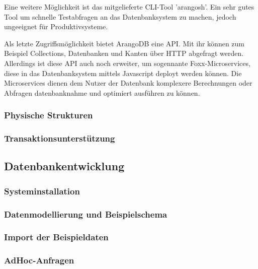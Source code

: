 Eine weitere Möglichkeit ist das mitgelieferte \ac{CLI}-Tool 'arangosh'. Ein sehr gutes Tool um schnelle Testabfragen an das Datenbanksystem zu machen, jedoch ungeeignet für Produktivsysteme. \cite{ADB_arangosh}

Als letzte Zugriffsmöglichkeit bietet ArangoDB eine \ac{API}. Mit ihr können zum Beispiel Collections, Datenbanken und Kanten über \ac{HTTP} abgefragt werden. \cite{ADB_api} Allerdings ist diese \ac{API} auch noch erweiter, um sogennante Foxx-Microservices, diese in das Datenbanksystem mittels Javascript deployt werden können. Die Microservices dienen dem Nutzer der Datenbank komplexere Berechnungen oder Abfragen datenbanknahme und optimiert ausführen zu können. \cite{ADB_foxx}

\subsubsection{Physische Strukturen}
\subsubsection{Transaktionsunterstützung}

\subsection{Datenbankentwicklung}
\subsubsection{Systeminstallation}
\subsubsection{Datenmodellierung und Beispielschema}
\subsubsection{Import der Beispieldaten}
\subsubsection{AdHoc-Anfragen}